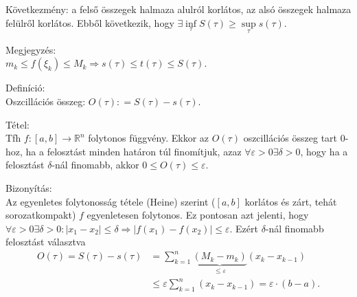 \documentclass[12pt,a4paper]{scrartcl}
\newenvironment{definicio}{}{}
\newenvironment{tetel}{}{}
\newenvironment{bizonyitas}{}{}
\newenvironment{megjegyzes}{}{}
\begin{document}
Következmény: a felső összegek halmaza alulról korlátos, az alsó
összegek halmaza felülről korlátos. Ebből következik, hogy
\(\exists\inf\limits_{\tau}S\left( \tau \right) \geq \sup\limits_{\tau}s\left( \tau \right)\).

\begin{megjegyzes}

Megjegyzés:\\
\(\left. m_{k} \leq f\left( \xi_{k} \right) \leq M_{k}\Rightarrow s\left( \tau \right) \leq t\left( \tau \right) \leq S\left( \tau \right) \right.\).

\end{megjegyzes}

\begin{definicio}

Definíció:\\
Oszcillációs összeg:
\(O\left( \tau \right): = S\left( \tau \right) - s\left( \tau \right)\).

\end{definicio}

\begin{tetel}

Tétel:\\
Tfh
\(\left. f:\left\lbrack {a,b} \right\rbrack\rightarrow{\mathbb{R}}^{n} \right.\)
folytonos függvény. Ekkor az \(O\left( \tau \right)\) oszcillációs
összeg tart 0-hoz, ha a felosztást minden határon túl finomítjuk, azaz
\(\forall\varepsilon > 0\exists\delta > 0\), hogy ha a felosztást
\(\delta\)-nál finomabb, akkor
\(0 \leq O\left( \tau \right) \leq \varepsilon\).

\end{tetel}

\begin{bizonyitas}

Bizonyítás:\\
Az egyenletes folytonosság tétele (Heine) szerint
(\(\left\lbrack {a,b} \right\rbrack\) korlátos és zárt, tehát
sorozatkompakt) \(f\) egyenletesen folytonos. Ez pontosan azt jelenti,
hogy
\(\left. \forall\varepsilon > 0\exists\delta > 0:\left| {x_{1} - x_{2}} \right| \leq \delta\Rightarrow\left| {f\left( x_{1} \right) - f\left( x_{2} \right)} \right| \leq \varepsilon \right.\).
Ezért \(\delta\)-nál finomabb felosztást választva \[\begin{aligned}
  O\left( \tau  \right) = S\left( \tau  \right) - s\left( \tau  \right) &  = \mathop \sum \limits_{k = 1}^n \underbrace {\left( {{M_k} - {m_k}} \right)}_{ \leqslant \varepsilon }\left( {{x_k} - {x_{k - 1}}} \right) \\ 
   &  \leqslant \varepsilon \mathop \sum \limits_{k = 1}^n \left( {{x_k} - {x_{k - 1}}} \right) = \varepsilon  \cdot \left( {b - a} \right).\\ 
\end{aligned} \]

\end{bizonyitas}
\end{document}
